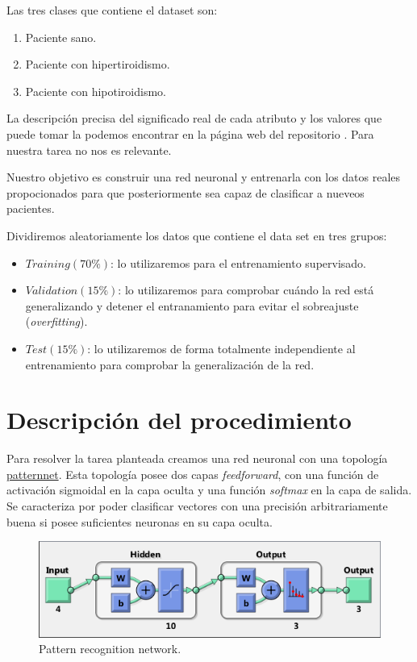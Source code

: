 \documentclass[a4paper,12pt,titlepage]{article}
\begin{document}
\newpage

Las tres clases que contiene el dataset son:

\begin{enumerate}[noitemsep]
	\item Paciente sano.
	\item Paciente con hipertiroidismo.
	\item Paciente con hipotiroidismo.
\end{enumerate}

La descripción precisa del significado real de cada atributo y los valores que puede tomar la podemos encontrar en la página web del repositorio \citep{Asuncion+Newman:2007}. Para nuestra tarea no nos es relevante.

Nuestro objetivo es construir una red neuronal y entrenarla con los datos reales propocionados para que posteriormente sea capaz de clasificar a nueveos pacientes. 

Dividiremos aleatoriamente los datos que contiene el data set en tres grupos:

\begin{itemize}[noitemsep]
	\item $Training (70\%)$: lo utilizaremos para el entrenamiento supervisado.
	\item $Validation (15\%)$: lo utilizaremos para comprobar cuándo la red está generalizando y detener el entranamiento para evitar el sobreajuste (\textit{overfitting}).
	\item $Test (15\%)$: lo utilizaremos de forma totalmente independiente al entrenamiento para comprobar la generalización de la red.
\end{itemize}

\section{Descripción del procedimiento}

Para resolver la tarea planteada creamos una red neuronal con una topología \href{http://www.mathworks.com/help/nnet/ref/patternnet.html}{patternnet}. Esta topología posee dos capas \textit{feedforward}, con una función de activación sigmoidal en la capa oculta y una función \textit{softmax} en la capa de salida. Se caracteriza por poder clasificar vectores con una precisión arbitrariamente buena si posee suficientes neuronas en su capa oculta.

\begin{figure}[!ht]
	\centering
	\label{fig:patternnet}
	\includegraphics[width=\textwidth]{patternnet.png}
	\caption{Pattern recognition network.}
\end{figure}
\end{document}

